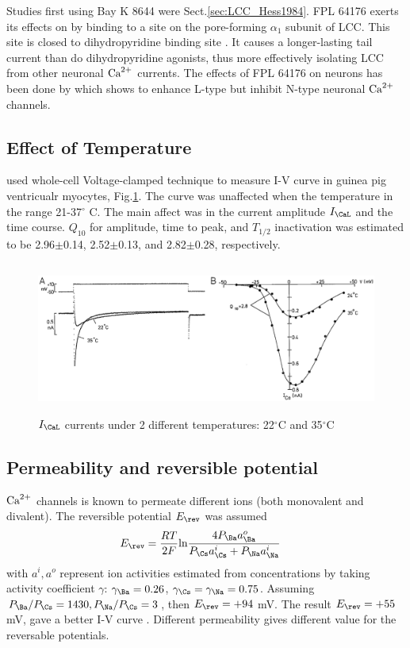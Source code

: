 Studies first using Bay K 8644 were Sect.\ref{sec:LCC_Hess1984}. FPL 64176 exerts
its effects on by binding to a site on the pore-forming $\alpha_1$ subunit of
LCC. This site is closed to dihydropyridine binding site \citep{rampe1991}. It
causes a longer-lasting tail current than do dihydropyridine agonists, thus more
effectively isolating LCC from other neuronal ${\text{Ca}^{2+}}$ currents\citep{lewis1994}.
The effects of FPL 64176 on neurons has been done by \citep{Liu2003} which
shows to enhance L-type but inhibit N-type neuronal ${\text{Ca}^{2+}}$ channels.


\subsection{Effect of Temperature}

\citep{cavalie1985tit} used whole-cell Voltage-clamped technique to measure
I-V  curve in guinea pig ventricualr myocytes,
Fig.\ref{fig:ICaL_temperature_Cavalie1985}. The curve was unaffected when the
temperature in the range 21-37$^\circ$ C. The main affect was in the current
amplitude $I_\CaL$ and the time course. $Q_{10}$ for amplitude, time to peak,
and $T_{1/2}$ inactivation was estimated to be 2.96$\pm$0.14, 2.52$\pm$0.13, and
2.82$\pm$0.28, respectively.

\begin{figure}[hbt]
  \centerline{\includegraphics[height=5cm,
    angle=0]{./images/ICaL_temp_Cavalie1985.eps}}
\caption{$I_\CaL$ currents under 2 different temperatures: 22$^\circ$C and
35$^\circ$C}
\label{fig:ICaL_temperature_Cavalie1985}
\end{figure}


\subsection{Permeability and reversible potential}

${\text{Ca}^{2+}}$ channels is known to permeate different ions (both monovalent and
divalent). The reversible potential $E_\rev$ was assumed
\begin{equation}
\begin{split}
E_\rev &= \frac{RT}{2F}\ln\frac{4P_\Ba a^o_\Ba}{P_\Cs a^i_\Cs + P_\Na a^i_\Na}
 \end{split}
\end{equation}
with $a^i, a^o$ represent ion activities estimated from concentrations by taking
activity coefficient $\gamma$: $\gamma_\Ba=0.26$, $\gamma_\Cs=\gamma_\Na=0.75$.
Assuming $P_\Ba/P_\Cs=1430, P_\Na/P_\Cs=3$, then $E_\rev= +94$ mV. The result
$E_\rev=+55$ mV, gave a better I-V  curve \citep{mcdonald1986}. Different
permeability gives different value for the reversable potentials. 


